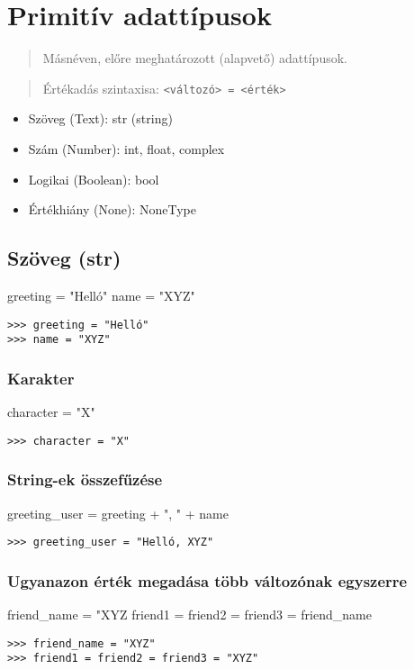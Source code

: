 \section{Primitív adattípusok}
\begin{quote}
    Másnéven, előre meghatározott (alapvető) adattípusok.
\end{quote}
\begin{quote}
    Értékadás szintaxisa: \texttt{<változó> = <érték>}
\end{quote}

\begin{itemize}
    \item Szöveg (Text): str (string)
    \item Szám (Number): int, float, complex
    \item Logikai (Boolean): bool
    \item Értékhiány (None): NoneType
\end{itemize}

\subsection{Szöveg (str)}
\begin{pycode}
    greeting = "Helló"
    name = "XYZ"
\end{pycode}
\begin{verbatim}
>>> greeting = "Helló"
>>> name = "XYZ"
\end{verbatim}

\subsubsection{Karakter}
\begin{pycode}
    character = "X"
\end{pycode}
\begin{verbatim}
>>> character = "X"
\end{verbatim}

\subsubsection{String-ek összefűzése}
\begin{pycode}
    greeting_user = greeting + ", " + name
\end{pycode}
\begin{verbatim}
>>> greeting_user = "Helló, XYZ"
\end{verbatim}

\subsubsection{Ugyanazon érték megadása több változónak egyszerre}
\begin{pycode}
    friend_name = "XYZ
    friend1 = friend2 = friend3 = friend_name
\end{pycode}
\begin{verbatim}
>>> friend_name = "XYZ"
>>> friend1 = friend2 = friend3 = "XYZ"
\end{verbatim}

